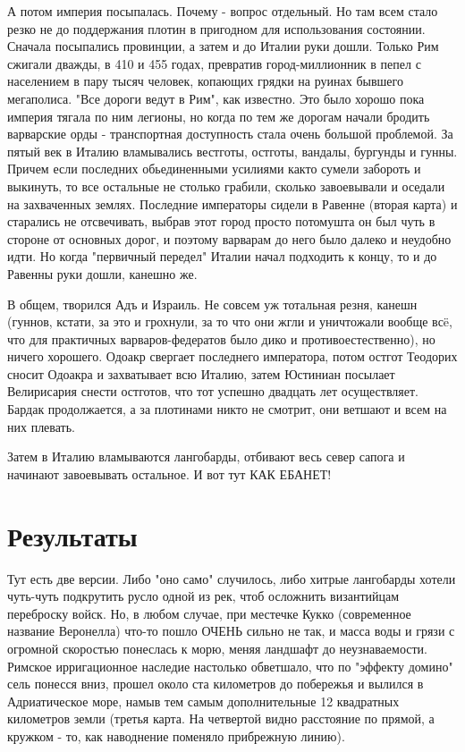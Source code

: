 А потом империя посыпалась. Почему - вопрос отдельный. Но там всем стало резко не до поддержания плотин в пригодном для использования состоянии. Сначала посыпались провинции, а затем и до Италии руки дошли. Только Рим сжигали дважды, в 410 и 455 годах, превратив город-миллионник в пепел с населением в пару тысяч человек, копающих грядки на руинах бывшего мегаполиса. "Все дороги ведут в Рим", как известно. Это было хорошо пока империя тягала по ним легионы, но когда по тем же дорогам начали бродить варварские орды - транспортная доступность стала очень большой проблемой. За пятый век в Италию вламывались вестготы, остготы, вандалы, бургунды и гунны. Причем если последних обьединенными усилиями както сумели забороть и выкинуть, то все остальные не столько грабили, сколько завоевывали и оседали на захваченных землях. Последние императоры сидели в Равенне (вторая карта) и старались не отсвечивать, выбрав этот город просто потомушта он был чуть в стороне от основных дорог, и поэтому варварам до него было далеко и неудобно идти. Но когда "первичный передел" Италии начал подходить к концу, то и до Равенны руки дошли, канешно же.


В общем, творился Адъ и Израиль. Не совсем уж тотальная резня, канешн (гуннов, кстати, за это и грохнули, за то что они жгли и уничтожали вообще всë, что для практичных варваров-федератов было дико и противоестественно), но ничего хорошего. Одоакр свергает последнего императора, потом остгот Теодорих сносит Одоакра и захватывает всю Италию, затем Юстиниан посылает Велирисария снести остготов, что тот успешно двадцать лет осуществляет. Бардак продолжается, а за плотинами никто не смотрит, они ветшают и всем на них плевать.


Затем в Италию вламываются лангобарды, отбивают весь север сапога и начинают завоевывать остальное. И вот тут КАК ЕБАНЕТ!




\section{Результаты}

Тут есть две версии. Либо "оно само" случилось, либо хитрые лангобарды хотели чуть-чуть подкрутить русло одной из рек, чтоб осложнить византийцам переброску войск. Но, в любом случае, при местечке Кукко (современное название Веронелла) что-то пошло ОЧЕНЬ сильно не так, и масса воды и грязи с огромной скоростью понеслась к морю, меняя ландшафт до неузнаваемости. Римское ирригационное наследие настолько обветшало, что по "эффекту домино" сель понесся вниз, прошел около ста километров до побережья и вылился в Адриатическое море, намыв тем самым дополнительные 12 квадратных километров земли (третья карта. На четвертой видно расстояние по прямой, а кружком - то, как наводнение поменяло прибрежную линию). 


